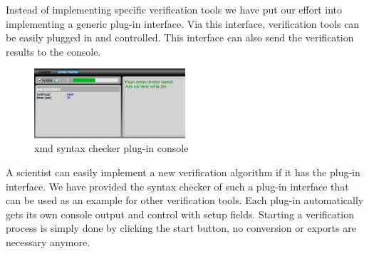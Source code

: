 Instead of implementing specific verification tools we have put our effort into
implementing a generic plug-in interface. Via this interface, verification tools
can be easily plugged in and controlled. This interface can also send the
verification results to the console.
\begin{figure}
  \vspace{-20pt}
  \begin{center}
    \includegraphics[width=0.50\textwidth]{console}
  \end{center}
  \vspace{-20pt}
  \caption{xmd syntax checker plug-in console}
  \label{fig:console}
  \vspace{-10pt}
\end{figure}
A scientist can easily implement a new verification algorithm if it has the
plug-in interface. We have provided the syntax checker of such a plug-in interface
that can be used as an example for other verification tools. Each plug-in
automatically gets its own console output and control with setup fields.
Starting a verification process is simply done by clicking the start button, no
conversion or exports are necessary anymore.


